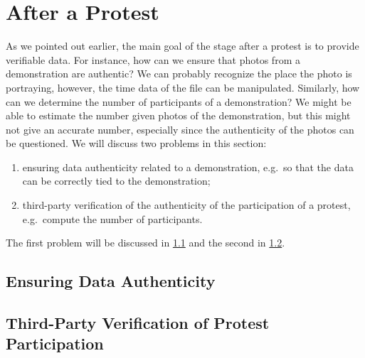 \section{After a Protest}
\label{AfterProtest}

As we pointed out earlier, the main goal of the stage after a protest is to 
provide verifiable data.
For instance, how can we ensure that photos from a demonstration are authentic?
We can probably recognize the place the photo is portraying, however, the time 
data of the file can be manipulated.
Similarly, how can we determine the number of participants of a demonstration?
We might be able to estimate the number given photos of the demonstration, but 
this might not give an accurate number, especially since the authenticity of 
the photos can be questioned.
We will discuss two problems in this section:
\begin{enumerate}
  \item ensuring data authenticity related to a demonstration, e.g.\ so that 
    the data can be correctly tied to the demonstration;
  \item third-party verification of the authenticity of the participation of 
    a protest, e.g.\ compute the number of participants.
\end{enumerate}

The first problem will be discussed in \cref{DataAuthenticicty} and the second 
in \cref{ParticipationAuthenticity}.

\subsection{Ensuring Data Authenticity}
\label{DataAuthenticicty}



\subsection{Third-Party Verification of Protest Participation}
\label{ParticipationAuthenticity}


